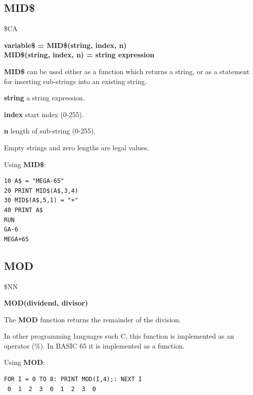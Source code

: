 \subsection{MID\$}
\begin{description}[leftmargin=2cm,style=nextline]
\item [Token:] \$CA
\item [Format:] {\bf variable\$ = MID\$(string, index, n)} \\
                {\bf MID\$(string, index, n) = string expression}
\item [Usage:]  {\bf MID\$} can be used either as a function
                which returns a string, or as a statement for
                inserting sub-strings into an existing string.

               {\bf string} a string expression.

               {\bf index} start index (0-255).

               {\bf n} length of sub-string (0-255).

\item [Remarks:] Empty strings and zero lengths are legal values.

\item [Example:] Using {\bf MID\$}:
\begin{tcolorbox}[colback=black,coltext=white]
\verbatimfont{\codefont}
\begin{verbatim}
10 A$ = "MEGA-65"
20 PRINT MID$(A$,3,4)
30 MID$(A$,5,1) = "+"
40 PRINT A$
RUN
GA-6
MEGA+65
\end{verbatim}
\end{tcolorbox}
\end{description}


\newpage
\subsection{MOD}
\begin{description}[leftmargin=2cm,style=nextline]
\item [Token:] \$NN
\item [Format:] {\bf MOD(dividend, divisor)}
\item [Usage:] The {\bf MOD} function returns the remainder of the
      division.
\item [Remarks:] In other programming languages such C, this function
      is implemented as an operator (\%). In BASIC 65 it is implemented as a function.

\item [Example:] Using {\bf MOD}:
\begin{tcolorbox}[colback=black,coltext=white]
\verbatimfont{\codefont}
\begin{verbatim}
FOR I = 0 TO 8: PRINT MOD(I,4);: NEXT I
 0  1  2  3  0  1  2  3  0
\end{verbatim}
\end{tcolorbox}
\end{description}

